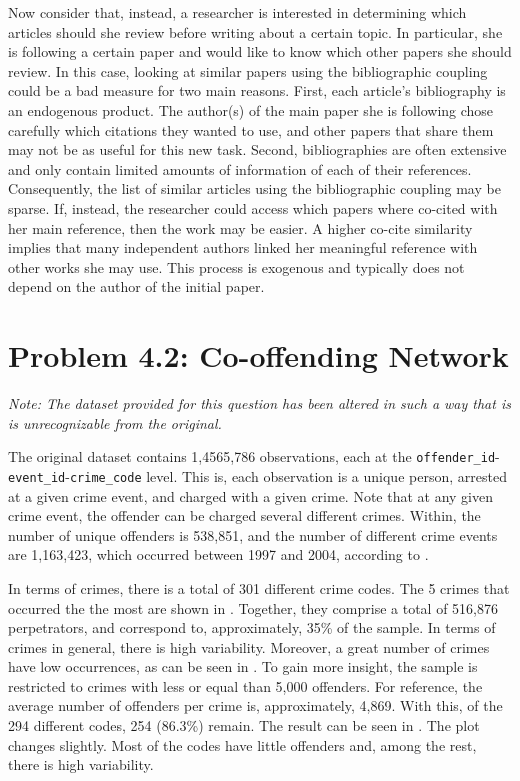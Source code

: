 \documentclass[11pt, english]{article}
\begin{document}
\begin{multicols}{2}
Now consider that, instead, a researcher is interested in determining which articles should she review before writing about a certain topic. In particular, she is following a certain paper and would like to know which other papers she should review. In this case, looking at similar papers using the bibliographic coupling could be a bad measure for two main reasons. First, each article's bibliography is an endogenous product. The author(s) of the main paper she is following chose carefully which citations they wanted to use, and other papers that share them may not be as useful for this new task. Second, bibliographies are often extensive and only contain limited amounts of information of each of their references. Consequently, the list of similar articles using the bibliographic coupling may be sparse. If, instead, the researcher could access which papers where co-cited with her main reference, then the work may be easier. A higher co-cite similarity implies that many independent authors linked her meaningful reference with other works she may use. This process is exogenous and typically does not depend on the author of the initial paper.

\section*{Problem 4.2: Co-offending Network}

\textit{Note: The dataset provided for this question has been altered in such a way that is is unrecognizable from the original.}\vspace{1.5ex}

The original dataset contains 1,4565,786 observations, each at the \texttt{offender\_id}-\texttt{event\_id}-\texttt{crime\_code} level. This is, each observation is a unique person, arrested at a given crime event, and charged with a given crime. Note that at any given crime event, the offender can be charged several different crimes. Within, the number of unique offenders is 538,851, and the number of different crime events are 1,163,423, which occurred between 1997 and 2004, according to . 

In terms of crimes, there is a total of 301 different crime codes. The 5 crimes that occurred the the most are shown in . Together, they comprise a total of 516,876 perpetrators, and correspond to, approximately, 35\% of the sample. In terms of crimes in general, there is high variability. Moreover, a great number of crimes have low occurrences, as can be seen in . To gain more insight, the sample is restricted to crimes with less or equal than 5,000 offenders. For reference, the average number of offenders per crime is, approximately, 4,869. With this, of the 294 different codes, 254 (86.3\%) remain. The result can be seen in . The plot changes slightly. Most of the codes have little offenders and, among the rest, there is high variability.


\end{multicols}
\end{document}
